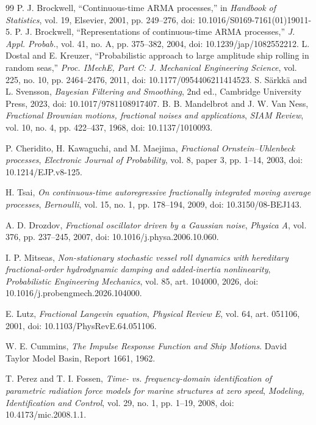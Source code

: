 \documentclass[10pt,journal]{IEEEtran}
\begin{document}
\begin{thebibliography}{99}
P. J. Brockwell, ``Continuous-time ARMA processes,''
in \emph{Handbook of Statistics}, vol. 19,
Elsevier, 2001, pp. 249--276,
doi: 10.1016/S0169-7161(01)19011-5.
P. J. Brockwell, ``Representations of continuous-time
ARMA processes,'' \emph{J. Appl. Probab.},
vol. 41, no. A, pp. 375--382, 2004,
doi: 10.1239/jap/1082552212.
L. Dostal and E. Kreuzer,
``Probabilistic approach to large amplitude ship rolling in
random seas,'' \emph{Proc. IMechE, Part C: J. Mechanical
Engineering Science}, vol. 225, no. 10,
pp. 2464--2476, 2011,
doi: 10.1177/0954406211414523.
S. S\"arkk\"a and L. Svensson,
\emph{Bayesian Filtering and Smoothing}, 2nd ed.,
Cambridge University Press, 2023,
doi: 10.1017/9781108917407.
B. B. Mandelbrot and J. W. Van Ness,
\emph{Fractional Brownian motions, fractional noises and applications},
\emph{SIAM Review}, vol. 10, no. 4, pp. 422--437, 1968,
doi: 10.1137/1010093.

P. Cheridito, H. Kawaguchi, and M. Maejima,
\emph{Fractional Ornstein--Uhlenbeck processes},
\emph{Electronic Journal of Probability}, vol. 8,
paper 3, pp. 1--14, 2003, doi: 10.1214/EJP.v8-125.

H. Tsai, \emph{On continuous-time autoregressive fractionally
integrated moving average processes},
\emph{Bernoulli}, vol. 15, no. 1, pp. 178--194, 2009,
doi: 10.3150/08-BEJ143.

A. D. Drozdov, \emph{Fractional oscillator driven by a Gaussian noise},
\emph{Physica A}, vol. 376, pp. 237--245, 2007,
doi: 10.1016/j.physa.2006.10.060.

I. P. Mitseas, \emph{Non-stationary stochastic vessel roll dynamics with
hereditary fractional-order hydrodynamic damping and added-inertia
nonlinearity}, \emph{Probabilistic Engineering Mechanics},
vol. 85, art. 104000, 2026,
doi: 10.1016/j.probengmech.2026.104000.

E. Lutz, \emph{Fractional Langevin equation},
\emph{Physical Review E}, vol. 64, art. 051106, 2001,
doi: 10.1103/PhysRevE.64.051106.

W. E. Cummins, \emph{The Impulse Response Function and Ship Motions}.
David Taylor Model Basin, Report 1661, 1962.

T. Perez and T. I. Fossen, \emph{Time- vs. frequency-domain
identification of parametric radiation force models for marine
structures at zero speed}, \emph{Modeling, Identification and
Control}, vol. 29, no. 1, pp. 1--19, 2008,
doi: 10.4173/mic.2008.1.1.


\end{thebibliography}
\end{document}
